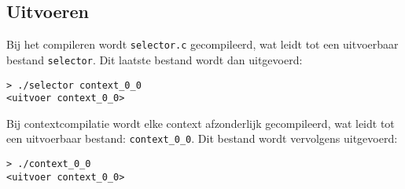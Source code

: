 \inputminted{c}{sources/echo-function/selector.c}

\subsection{Uitvoeren}\label{subsec:echo-function-c-uitvoeren}

Bij het compileren wordt \texttt{selector.c} gecompileerd, wat leidt tot een uitvoerbaar bestand \texttt{selector}.
Dit laatste bestand wordt dan uitgevoerd:

\begin{verbatim}
> ./selector context_0_0
<uitvoer context_0_0>
\end{verbatim}


Bij contextcompilatie wordt elke context afzonderlijk gecompileerd, wat leidt tot een uitvoerbaar bestand: \texttt{context\_0\_0}.
Dit bestand wordt vervolgens uitgevoerd:

\begin{verbatim}
> ./context_0_0
<uitvoer context_0_0>
\end{verbatim}

